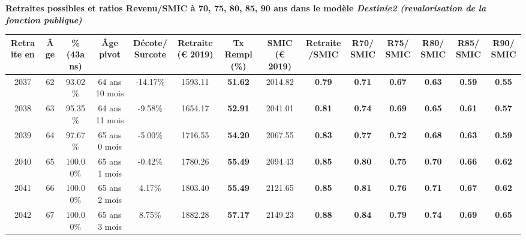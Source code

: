  \vspace{0.1cm} 
{\bf \noindent Retraites possibles et ratios Revenu/SMIC à 70, 75, 80, 85, 90 ans dans le modèle \emph{Destinie2 (revalorisation de la fonction publique)}}  
 
\begin{adjustbox}{max width=\textwidth} 
\begin{tabular}[htb]{|c|c||c|c|c||c|c||c|c||c|c|c|c|c|} 
\hline 
 Retraite en &  Âge &  \%(43ans) &  Âge pivot &  Décote/Surcote &  Retraite (\euro{} 2019) &  Tx Rempl(\%) &  SMIC (\euro{} 2019) &  Retraite/SMIC &  R70/SMIC &  R75/SMIC &  R80/SMIC &  R85/SMIC &  R90/SMIC \\ 
\hline \hline 
 2037 &  62 &  93.02\% &  64 ans 10 mois &  -14.17\% &  1593.11 &  {\bf 51.62} &  2014.82 &  {\bf {\color{red} 0.79}} &  {\bf {\color{red} 0.71}} &  {\bf {\color{red} 0.67}} &  {\bf {\color{red} 0.63}} &  {\bf {\color{red} 0.59}} &  {\bf {\color{red} 0.55}} \\ 
\hline 
 2038 &  63 &  95.35\% &  64 ans 11 mois &  -9.58\% &  1654.17 &  {\bf 52.91} &  2041.01 &  {\bf {\color{red} 0.81}} &  {\bf {\color{red} 0.74}} &  {\bf {\color{red} 0.69}} &  {\bf {\color{red} 0.65}} &  {\bf {\color{red} 0.61}} &  {\bf {\color{red} 0.57}} \\ 
\hline 
 2039 &  64 &  97.67\% &  65 ans 0 mois &  -5.00\% &  1716.55 &  {\bf 54.20} &  2067.55 &  {\bf {\color{red} 0.83}} &  {\bf {\color{red} 0.77}} &  {\bf {\color{red} 0.72}} &  {\bf {\color{red} 0.68}} &  {\bf {\color{red} 0.63}} &  {\bf {\color{red} 0.59}} \\ 
\hline 
 2040 &  65 &  100.00\% &  65 ans 1 mois &  -0.42\% &  1780.26 &  {\bf 55.49} &  2094.43 &  {\bf {\color{red} 0.85}} &  {\bf {\color{red} 0.80}} &  {\bf {\color{red} 0.75}} &  {\bf {\color{red} 0.70}} &  {\bf {\color{red} 0.66}} &  {\bf {\color{red} 0.62}} \\ 
\hline 
 2041 &  66 &  100.00\% &  65 ans 2 mois &  4.17\% &  1803.40 &  {\bf 55.49} &  2121.65 &  {\bf {\color{red} 0.85}} &  {\bf {\color{red} 0.81}} &  {\bf {\color{red} 0.76}} &  {\bf {\color{red} 0.71}} &  {\bf {\color{red} 0.67}} &  {\bf {\color{red} 0.62}} \\ 
\hline 
 2042 &  67 &  100.00\% &  65 ans 3 mois &  8.75\% &  1882.28 &  {\bf 57.17} &  2149.23 &  {\bf {\color{red} 0.88}} &  {\bf {\color{red} 0.84}} &  {\bf {\color{red} 0.79}} &  {\bf {\color{red} 0.74}} &  {\bf {\color{red} 0.69}} &  {\bf {\color{red} 0.65}} \\ 
\hline 
\hline 
\end{tabular} 
\end{adjustbox} 
 
